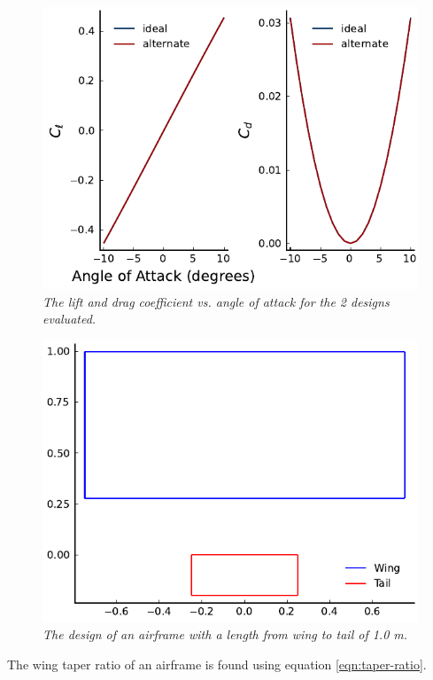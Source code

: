 \documentclass[journal]{new-aiaa}
\begin{document}
	\begin{figure}[H]
		\centering
		\includegraphics{../graphics/wingtail_coeff.pdf}
		\caption{\emph{The lift and drag coefficient vs. angle of attack for the 2 designs evaluated.}}
		\label{fig:wingtail_coeff}
	\end{figure}
	
	\begin{figure}[H]
		\centering
		\includegraphics{../graphics/length_design.pdf}
		\caption{\emph{The design of an airframe with a length from wing to tail of 1.0 m.}}
		\label{fig:length_design}
	\end{figure}
	
	The wing taper ratio of an airframe is found using equation \ref{eqn:taper-ratio}.
	
\end{document}
